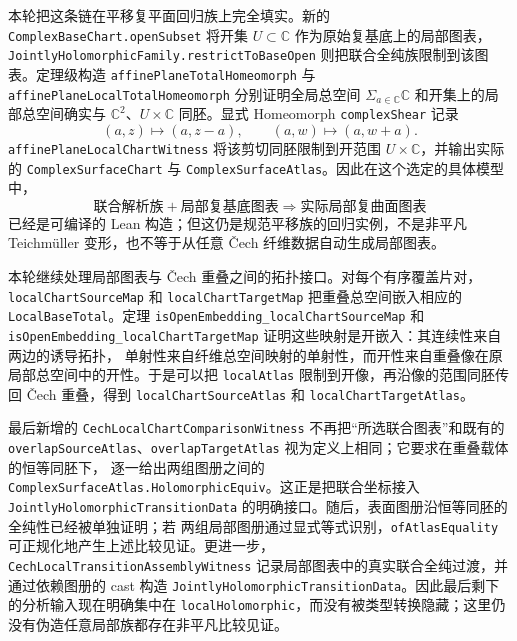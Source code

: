 \documentclass[UTF8,fontset=none,a4paper,11pt]{ctexart}
\begin{document}
\begin{sloppypar}
本轮把这条链在平移复平面回归族上完全填实。新的
\texttt{ComplexBaseChart.openSubset} 将开集 \(U\subset\mathbb C\) 作为原始复基底上的局部图表，
\texttt{JointlyHolomorphicFamily.restrictToBaseOpen} 则把联合全纯族限制到该图表。定理级构造
\texttt{affinePlaneTotalHomeomorph} 与 \texttt{affinePlaneLocalTotalHomeomorph} 分别证明全局总空间
\(\Sigma_{a\in\mathbb C}\mathbb C\) 和开集上的局部总空间确实与 \(\mathbb C^2\)、\(U\times\mathbb C\)
同胚。显式 Homeomorph \texttt{complexShear} 记录
\[
  (a,z)\longmapsto(a,z-a),\qquad (a,w)\longmapsto(a,w+a).
\]
\texttt{affinePlaneLocalChartWitness} 将该剪切同胚限制到开范围
\(U\times\mathbb C\)，并输出实际的 \texttt{ComplexSurfaceChart} 与
\texttt{ComplexSurfaceAtlas}。因此在这个选定的具体模型中，
\[
  \text{联合解析族}+\text{局部复基底图表}\Longrightarrow\text{实际局部复曲面图表}
\]
已经是可编译的 Lean 构造；但这仍是规范平移族的回归实例，不是非平凡 Teichmüller 变形，也不等于从任意
Čech 纤维数据自动生成局部图表。
\end{sloppypar}

\begin{sloppypar}
本轮继续处理局部图表与 Čech 重叠之间的拓扑接口。对每个有序覆盖片对，
\texttt{localChartSourceMap} 和 \texttt{localChartTargetMap} 把重叠总空间嵌入相应的
\texttt{LocalBaseTotal}。定理
\texttt{isOpenEmbedding\_}\allowbreak\texttt{localChartSourceMap} 和
\texttt{isOpenEmbedding\_}\allowbreak\texttt{localChartTargetMap} 证明这些映射是开嵌入：其连续性来自两边的诱导拓扑，
单射性来自纤维总空间映射的单射性，而开性来自重叠像在原局部总空间中的开性。于是可以把
\texttt{localAtlas} 限制到开像，再沿像的范围同胚传回 Čech 重叠，得到
\texttt{localChartSourceAtlas} 和 \texttt{localChartTargetAtlas}。

最后新增的 \texttt{CechLocalChartComparisonWitness} 不再把“所选联合图表”和既有的
\texttt{overlapSourceAtlas}、\texttt{overlapTargetAtlas} 视为定义上相同；它要求在重叠载体的恒等同胚下，
逐一给出两组图册之间的 \texttt{ComplexSurfaceAtlas.}\allowbreak\texttt{HolomorphicEquiv}。这正是把联合坐标接入
\texttt{JointlyHolomorphicTransitionData} 的明确接口。随后，表面图册沿恒等同胚的全纯性已经被单独证明；若
两组局部图册通过显式等式识别，\texttt{ofAtlasEquality} 可正规化地产生上述比较见证。更进一步，
\texttt{CechLocalTransitionAssemblyWitness} 记录局部图表中的真实联合全纯过渡，并通过依赖图册的
cast 构造 \texttt{JointlyHolomorphicTransitionData}。因此最后剩下的分析输入现在明确集中在
\texttt{localHolomorphic}，而没有被类型转换隐藏；这里仍没有伪造任意局部族都存在非平凡比较见证。
\end{sloppypar}
\end{document}
